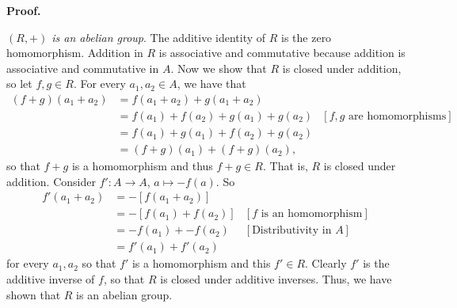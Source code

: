 \begin{enumerate}
      \textbf{Proof.}

      \textit{$(R, +)$ is an abelian group}. The additive identity of $R$ is the
      zero homomorphism. Addition in $R$ is associative and commutative because 
      addition is associative and commutative in $A$. Now we show that $R$ is
      closed under addition, so let $f, g \in R$. For every $a_1, a_2 \in A$, we
      have that
      \begin{align*}
         (f + g)(a_1 + a_2) &= f(a_1 + a_2) + g(a_1 + a_2) \\
            &= f(a_1) + f(a_2) + g(a_1) + g(a_2) &[f, g
               \text{ are homomorphisms}] \\
            &= f(a_1) + g(a_1) + f(a_2) + g(a_2) \\
            &= (f + g)(a_1) + (f + g)(a_2),
      \end{align*}
      so that $f + g$ is a homomorphism and thus $f + g \in R$. That is, $R$ is
      closed under addition. Consider $f' : A \rightarrow A$, $a \mapsto -f(a)$.
      So
      \begin{align*}
         f'(a_1 + a_2) &= -[f(a_1 + a_2)] \\
            &= -[f(a_1) + f(a_2)] &[f \text{ is an homomorphism}] \\
            &= -f(a_1) + -f(a_2)   &[\text{Distributivity in }A] \\
            &= f'(a_1) + f'(a_2)
      \end{align*}
      for every $a_1, a_2$ so that $f'$ is a homomorphism and this $f' \in R$.
      Clearly $f'$ is the additive inverse of $f$, so that $R$ is closed under
      additive inverses. Thus, we have shown that $R$ is an abelian group.
      

\end{enumerate}
